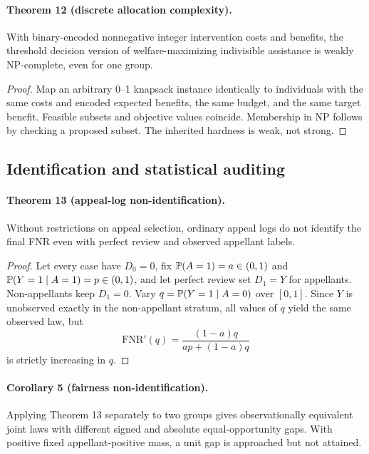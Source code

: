 \paragraph{Theorem 12 (discrete allocation complexity).}
With binary-encoded nonnegative integer intervention costs and benefits, the
threshold decision version of welfare-maximizing indivisible assistance is
weakly NP-complete, even for one group.

\begin{proof}
Map an arbitrary 0--1 knapsack instance identically to individuals with the
same costs and encoded expected benefits, the same budget, and the same target
benefit.  Feasible subsets and objective values coincide.  Membership in NP
follows by checking a proposed subset.  The inherited hardness is weak, not
strong.
\end{proof}

\subsection{Identification and statistical auditing}

\paragraph{Theorem 13 (appeal-log non-identification).}
Without restrictions on appeal selection, ordinary appeal logs do not identify
the final FNR even with perfect review and observed appellant labels.

\begin{proof}
Let every case have $D_0=0$, fix
$\mathbb{P}(A=1)=a\in(0,1)$ and
$\mathbb{P}(Y=1\mid A=1)=p\in(0,1)$, and let perfect review set $D_1=Y$ for
appellants.  Non-appellants keep $D_1=0$.  Vary
$q=\mathbb{P}(Y=1\mid A=0)$ over $[0,1]$.  Since $Y$ is unobserved exactly in
the non-appellant stratum, all values of $q$ yield the same observed law, but
\[
\mathrm{FNR}'(q)=\frac{(1-a)q}{ap+(1-a)q}
\]
is strictly increasing in $q$.
\end{proof}

\paragraph{Corollary 5 (fairness non-identification).}
Applying Theorem 13 separately to two groups gives observationally equivalent
joint laws with different signed and absolute equal-opportunity gaps.  With
positive fixed appellant-positive mass, a unit gap is approached but not
attained.

